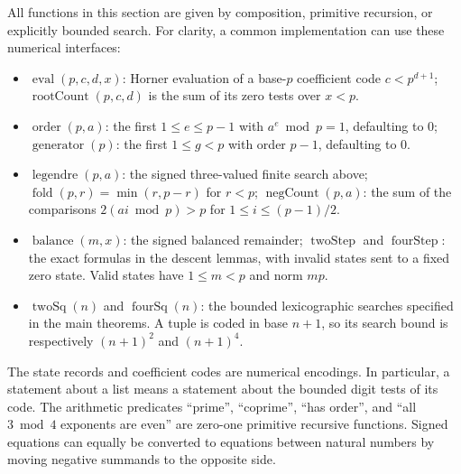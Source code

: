 All functions in this section are given by composition, primitive recursion,
or explicitly bounded search. For clarity, a common implementation can use
these numerical interfaces:
\begin{itemize}
\item $\operatorname{eval}(p,c,d,x)$: Horner evaluation of a base-$p$
coefficient code $c<p^{d+1}$; $\operatorname{rootCount}(p,c,d)$ is the
sum of its zero tests over $x<p$.
\item $\operatorname{order}(p,a)$: the first $1\le e\le p-1$ with
$a^e\bmod p=1$, defaulting to $0$; $\operatorname{generator}(p)$:
the first $1\le g<p$ with order $p-1$, defaulting to $0$.
\item $\operatorname{legendre}(p,a)$: the signed three-valued finite
search above; $\operatorname{fold}(p,r)=\min(r,p-r)$ for $r<p$;
$\operatorname{negCount}(p,a)$: the sum of the comparisons
$2(ai\bmod p)>p$ for $1\le i\le(p-1)/2$.
\item $\operatorname{balance}(m,x)$: the signed balanced remainder;
$\operatorname{twoStep}$ and $\operatorname{fourStep}$: the exact
formulas in the descent lemmas, with invalid states sent to a fixed
zero state. Valid states have $1\le m<p$ and norm $mp$.
\item $\operatorname{twoSq}(n)$ and $\operatorname{fourSq}(n)$:
the bounded lexicographic searches specified in the main theorems.
A tuple is coded in base $n+1$, so its search bound is respectively
$(n+1)^2$ and $(n+1)^4$.
\end{itemize}
The state records and coefficient codes are numerical encodings.  In
particular, a statement about a list means a statement about the bounded
digit tests of its code. The arithmetic predicates ``prime'', ``coprime'',
``has order'', and ``all $3\bmod4$ exponents are even'' are zero-one
primitive recursive functions. Signed equations can equally be converted
to equations between natural numbers by moving negative summands to the
opposite side.

